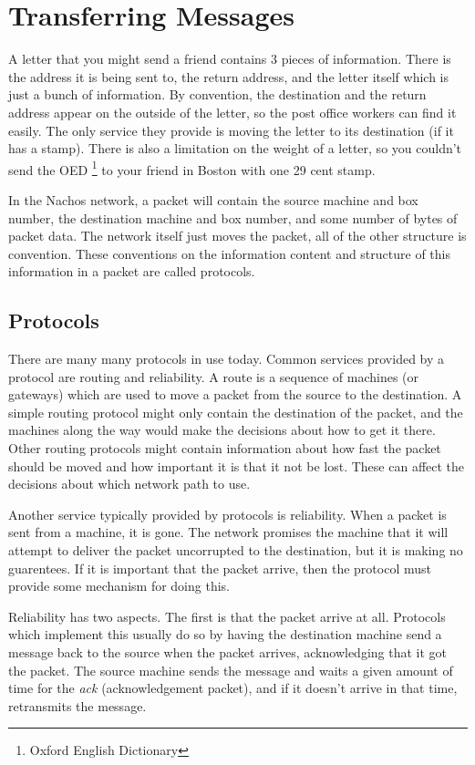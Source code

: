\section{Transferring Messages}

A letter that you might send a friend contains 3 pieces of information.  There
is the address it is being sent to, the return address, and the letter itself
which is just a bunch of information.  By convention, the destination and
the return address appear on the outside of the letter, so the post office
workers can find it easily.  The only service they provide is moving the
letter to its destination (if it has a stamp).  There is also a limitation
on the weight of a letter, so you couldn't send the OED 
\footnote{Oxford English Dictionary} to your friend in
Boston with one 29 cent stamp.

In the Nachos network, a packet will contain the source machine and box number,
the destination machine and box number, and some number of bytes of packet
data.
The network itself just moves the packet, all of the other structure
is convention.  These conventions on the information content and structure
of this information in a packet are called protocols.

\subsection{Protocols}

There are many many protocols in use today.  Common services provided by
a protocol are routing and reliability.  A route is a sequence of machines
(or gateways) which are used to move a packet from the source to the
destination.  A simple routing protocol might only contain the destination
of the packet, and the machines along the way would make the decisions about
how to get it there.  Other routing protocols might contain information about
how fast the packet should be moved and how important it is that it not be
lost.  These can affect the decisions about which network path to use.

Another service typically provided by protocols is reliability.  When a
packet is sent from a machine, it is gone.  The network promises the
machine that it will attempt to deliver the packet uncorrupted to the
destination, but it is making no guarentees.  If it is important that the
packet arrive, then the protocol must provide some mechanism for
doing this.

Reliability has two aspects.  The first is that the packet arrive at all.
Protocols which implement this usually do so by having the destination machine
send a message back to the source when the packet arrives, acknowledging that
it got the packet.  The source machine sends the message and waits a given
amount of time for the {\it ack} (acknowledgement packet), and if it doesn't
arrive in that time, retransmits the message.

